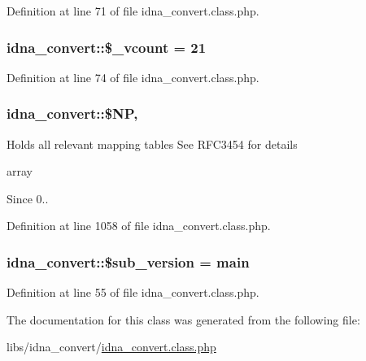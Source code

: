 Definition at line 71 of file idna\+\_\+convert.\+class.\+php.

\subsubsection[{\texorpdfstring{\$\+\_\+vcount}{$_vcount}}]{\setlength{\rightskip}{0pt plus 5cm}idna\+\_\+convert\+::\$\+\_\+vcount = 21\hspace{0.3cm}{\ttfamily [protected]}}\hypertarget{classidna__convert_afe217921aaa9aa954361f3aa090c69c1}{}\label{classidna__convert_afe217921aaa9aa954361f3aa090c69c1}


Definition at line 74 of file idna\+\_\+convert.\+class.\+php.

\subsubsection[{\texorpdfstring{\$\+NP}{$NP}}]{\setlength{\rightskip}{0pt plus 5cm}idna\+\_\+convert\+::\$\+NP\hspace{0.3cm}{\ttfamily [static]}, {\ttfamily [protected]}}\hypertarget{classidna__convert_a82881f4c426f3e6603e252c8bebc875f}{}\label{classidna__convert_a82881f4c426f3e6603e252c8bebc875f}
Holds all relevant mapping tables See R\+F\+C3454 for details

array \begin{DoxySince}{Since}
0.. 
\end{DoxySince}


Definition at line 1058 of file idna\+\_\+convert.\+class.\+php.

\subsubsection[{\texorpdfstring{\$sub\+\_\+version}{$sub_version}}]{\setlength{\rightskip}{0pt plus 5cm}idna\+\_\+convert\+::\$sub\+\_\+version = \textquotesingle{}main\textquotesingle{}\hspace{0.3cm}{\ttfamily [protected]}}\hypertarget{classidna__convert_a14d96b4efeba28496661be46a6f14a5c}{}\label{classidna__convert_a14d96b4efeba28496661be46a6f14a5c}


Definition at line 55 of file idna\+\_\+convert.\+class.\+php.



The documentation for this class was generated from the following file\+:\begin{DoxyCompactItemize}
\item 
libs/idna\+\_\+convert/\hyperlink{idna__convert_8class_8php}{idna\+\_\+convert.\+class.\+php}\end{DoxyCompactItemize}
